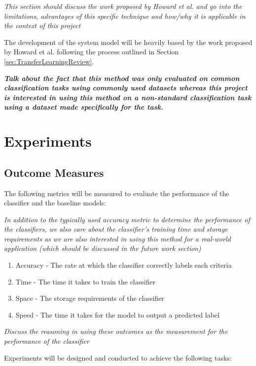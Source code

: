 \documentclass[a4paper,twoside,phd]{BYUPhys}
\begin{document}
\textit{This section should discuss the work proposed by Howard et al. and go into the limitations, advantages of this specific technique and how/why it is applicable in the context of this project}

The development of the system model will be heavily based by the work proposed by Howard et al. \cite{Howard2018} following the process outlined in Section \ref{sec:TransferLearningReview}.

\textit{\textbf{Talk about the fact that this method was only evaluated on common classification tasks using commonly used datasets whereas this project is interested in using this method on a non-standard classification task using a dataset made specifically for the task.}}


\section{Experiments}
\label{sec:Experiments}

\subsection{Outcome Measures}
\label{sec:OutcomeMeasures}

The following metrics will be measured to evaluate the performance of the classifier and the baseline models:

\textit{In addition to the typically used accuracy metric to determine the performance of the classifiers, we also care about the classifier's training time and storage requirements as we are also interested in using this method for a real-world application (which should be discussed in the future work section)}

\begin{enumerate}[1)]
	\item Accuracy - The rate at which the classifier correctly labels each criteria
	\item Time - The time it takes to train the classifier
	\item Space - The storage requirements of the classifier
	\item Speed - The time it takes for the model to output a predicted label
\end{enumerate}

\textit{Discuss the reasoning in using these outcomes as the measurement for the performance of the classifier}

Experiments will be designed and conducted to achieve the following tasks:
\end{document}
